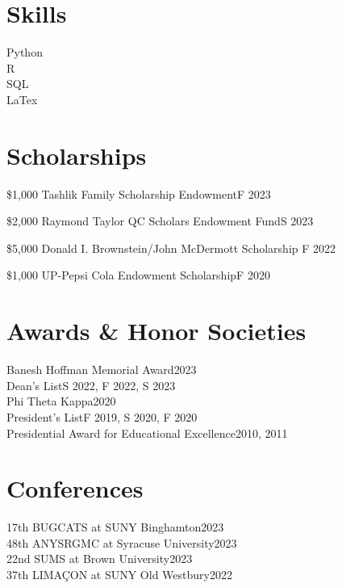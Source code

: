 \documentclass{article}
\begin{document}
\begin{flushleft}
\section*{Skills}
Python\\R\\SQL\\LaTex

\section*{Scholarships}

\$1,000 Tashlik Family Scholarship Endowment\hfill{F 2023}

\$2,000 Raymond Taylor QC Scholars Endowment Fund\hfill{S 2023}

\$5,000 Donald I. Brownstein/John McDermott Scholarship \hfill{F 2022}

\$1,000 UP-Pepsi Cola Endowment Scholarship\hfill{F 2020}

\section*{Awards \& Honor Societies}
Banesh Hoffman Memorial Award\hfill{2023}\\
Dean’s List\hfill{S 2022, F 2022, S 2023}\\
Phi Theta Kappa\hfill{2020}\\
President’s List\hfill{F 2019, S 2020, F 2020}\\
Presidential Award for Educational Excellence\hfill{2010, 2011}

\section*{Conferences}
17th BUGCATS at SUNY Binghamton\hfill{2023}\\
48th ANYSRGMC at Syracuse University\hfill{2023}\\
22nd SUMS at Brown University\hfill{2023}\\
37th LIMAÇON at SUNY Old Westbury\hfill{2022}
\end{flushleft}
\end{document}
